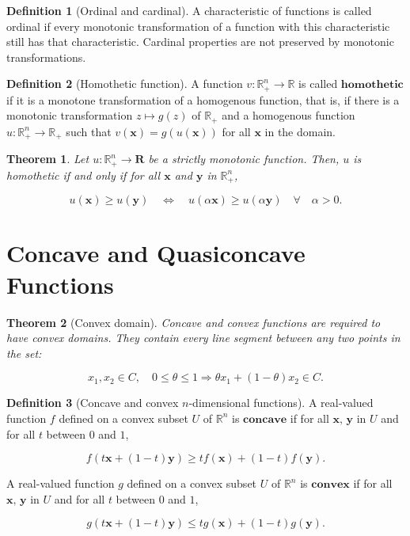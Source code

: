 \documentclass{article}
\newtheorem{theorem}{Theorem}
\theoremstyle{definition}
\newtheorem{definition}{Definition}
\theoremstyle{Solution}
\begin{document}
\begin{definition}[Ordinal and cardinal]
A characteristic of functions is called ordinal if every monotonic transformation of a function with this characteristic still has that characteristic. Cardinal properties are not preserved by monotonic transformations.
\end{definition}

\begin{definition}[Homothetic function]
A function $v: \mathbb{R}^n_+ \rightarrow \mathbb{R}$ is called $\textbf{homothetic}$ if it is a monotone transformation of a homogenous function, that is, if there is a monotonic transformation $z \mapsto g(z)$ of $\mathbb{R}_+$ and a homogenous function $u:\mathbb{R}^n_+ \rightarrow \mathbb{R}_+$ such that $v(\textbf{x})=g(u(\textbf{x}))$ for all $\textbf{x}$ in the domain.
\end{definition}

\begin{theorem} 
Let $u: \mathbb{R}^n_+ \rightarrow \textbf{R}$ be a strictly monotonic function. Then, $u$ is homothetic if and only if for all $\textbf{x}$ and $\textbf{y}$ in $\mathbb{R}^n_+$,

\begin{equation}
	u(\textbf{x}) \geq u(\textbf{y}) \quad \Leftrightarrow \quad u(\alpha \textbf{x}) \geq u(\alpha \textbf{y}) \quad \forall \quad \alpha > 0.
\end{equation}
\end{theorem}

\section{Concave and Quasiconcave Functions}

\begin{theorem}[Convex domain]
Concave and convex functions are required to have convex domains. They contain every line segment between any two points in the set:

\begin{equation}
x_1,x_2 \in C, \quad 0 \leq \theta \leq 1 \Rightarrow \theta x_1+(1-\theta)x_2 \in C.
\end{equation}
\end{theorem}

\begin{definition}[Concave and convex $n$-dimensional functions]
A real-valued function $f$ defined on a convex subset $U$ of $\mathbb{R}^n$ is $\textbf{concave}$ if for all $\textbf{x, y}$ in $U$ and for all $t$ between $0$ and $1$,

\begin{equation}
	f(t\mathbf{x}+(1-t)\textbf{y}) \geq tf(\textbf{x})+(1-t)f(\textbf{y}).
\end{equation}

A real-valued function $g$ defined on a convex subset $U$ of $\mathbb{R}^n$ is $\textbf{convex}$ if for all $\textbf{x, y}$ in $U$ and for all $t$ between $0$ and $1$,

\begin{equation}
	g(t\mathbf{x}+(1-t)\textbf{y}) \leq tg(\textbf{x})+(1-t)g(\textbf{y}).
\end{equation}
\end{definition}
\end{document}
